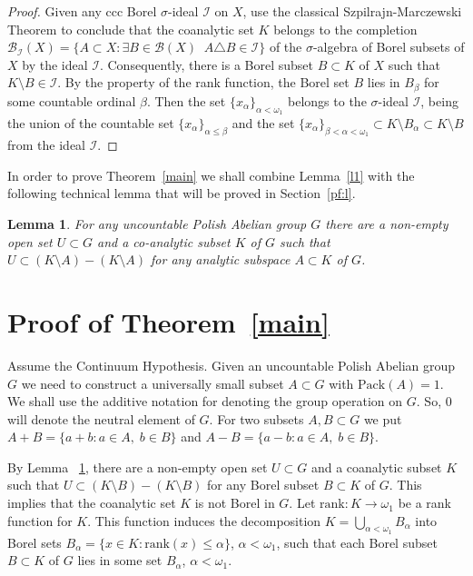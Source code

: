 \documentclass[11pt]{amsart}
\newtheorem{lemma}{Lemma}
\begin{document}
\begin{proof} Given any ccc Borel $\sigma$-ideal ${\mathcal I}$ on $X$, use the classical Szpilrajn-Marczewski Theorem \cite[\S11]{Ku} to conclude that the coanalytic set $K$ belongs to the completion $\mathcal B_{\mathcal I}(X)=\{A\subset X:\exists B\in \mathcal B(X)\;\;A\triangle B\in{\mathcal I}\}$ of the $\sigma$-algebra of Borel subsets of $X$ by the ideal $\mathcal I$. Consequently, there is a Borel subset $B\subset K$ of $X$ such that $K\setminus B\in\mathcal I$. By the property of the rank function, the Borel set $B$ lies in $B_\beta$ for some countable ordinal $\beta$. Then the set $\{x_\alpha\}_{\alpha<{\omega}_1}$ belongs to the $\sigma$-ideal ${\mathcal I}$, being the union
of the countable set $\{x_\alpha\}_{\alpha\le \beta}$ and the set $\{x_\alpha\}_{\beta<\alpha<{\omega}_1}\subset K\setminus B_\alpha\subset K\setminus B$ from the ideal ${\mathcal I}$.
\end{proof}

In order to prove Theorem~\ref{main} we shall combine Lemma~\ref{l1} with the following technical lemma that will be proved in Section~\ref{pf:l}.

\begin{lemma} \label{coan} For any uncountable Polish Abelian group $G$ there are a non-empty open set $U\subset G$ and a co-analytic subset $K$ of $G$ such that $U\subset(K\setminus A)-(K\setminus A)$ for
any analytic subspace $A\subset K$ of $G$.
\end{lemma}

\section{Proof of Theorem~\ref{main}} Assume the Continuum Hypothesis. Given an uncountable Polish Abelian group $G$ we need to construct a universally small subset $A\subset G$ with ${\mathrm{Pack}}(A)=1$. We shall use the additive notation for denoting the group operation on $G$. So, $0$ will denote the neutral element of $G$. For two subsets $A,B\subset G$ we put $A+B=\{a+b:a\in A,\;b\in B\}$ and $A-B=\{a-b:a\in A,\;b\in B\}$.

 By Lemma ~\ref{coan}, there are a non-empty open set $U\subset G$ and a
coanalytic subset $K$ such that $U\subset (K\setminus B)-(K\setminus B)$ for any Borel subset $B\subset K$ of $G$. This implies that the coanalytic set $K$ is not Borel in $G$. Let ${\mathrm{rank}}:K\to {\omega}_1$ be a rank function for $K$. This function induces the decomposition $K=\bigcup_{\alpha<{\omega}_1}B_\alpha$ into Borel sets $B_\alpha=\{x\in K:{\mathrm{rank}}(x)\le\alpha\}$, $\alpha<{\omega}_1$, such that each  Borel subset $B\subset K$ of $G$ lies in some set $B_\alpha$, $\alpha<{\omega}_1$.
\end{document}
